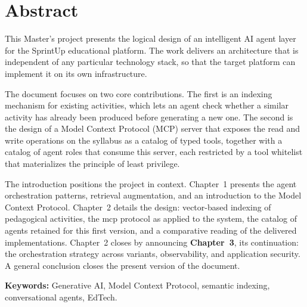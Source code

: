 \chapter*{Abstract}
\thispagestyle{plain}

\noindent
This Master's project presents the logical design of an intelligent AI agent
layer for the SprintUp educational platform. The work delivers an architecture
that is independent of any particular technology stack, so that the target
platform can implement it on its own infrastructure.

The document focuses on two core contributions. The first is an indexing
mechanism for existing activities, which lets an agent check whether a similar
activity has already been produced before generating a new one. The second is
the design of a Model Context Protocol (MCP) server that exposes the
read and write operations on the syllabus as a catalog of typed tools, together
with a catalog of agent roles that consume this server, each restricted by a
tool whitelist that materializes the principle of least privilege.

The introduction positions the project in context. Chapter~1 presents the
agent orchestration patterns, retrieval augmentation, and an introduction to
the Model Context Protocol. Chapter~2 details the design: vector-based indexing
of pedagogical activities, the \gls{mcp} protocol as applied to the system, the
catalog of agents retained for this first version, and a comparative reading of
the delivered implementations. Chapter~2 closes by announcing \textbf{Chapter~3},
its continuation: the orchestration strategy across variants, observability, and
application security. A general conclusion closes the present version of the
document.

\vspace{0.5cm}
\noindent
\textbf{Keywords:} Generative AI, Model Context Protocol, semantic indexing,
conversational agents, EdTech.
\newpage
